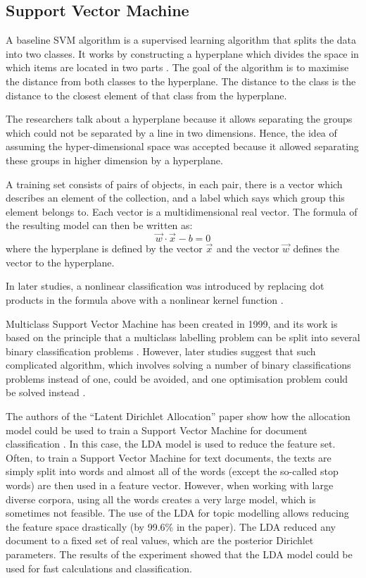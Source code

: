 \subsection{Support Vector Machine}
    A baseline SVM algorithm is a supervised learning algorithm that splits the data into two classes. It works by constructing a hyperplane which divides the space in which items are located in two parts \cite{vapnik1963pattern}. The goal of the algorithm is to maximise the distance from both classes to the hyperplane. The distance to the class is the distance to the closest element of that class from the hyperplane.
    
    The researchers talk about a hyperplane because it allows separating the groups which could not be separated by a line in two dimensions. Hence, the idea of assuming the hyper-dimensional space was accepted because it allowed separating these groups in higher dimension by a hyperplane.
    
    A training set consists of pairs of objects, in each pair, there is a vector which describes an element of the collection, and a label which says which group this element belongs to. Each vector is a multidimensional real vector. The formula of the resulting model can then be written as:
    $$ \vec{w}^{}\cdotp\vec{x}^{}-b=0 $$
    where the hyperplane is defined by the vector $\vec{x}^{}$ and the vector $\vec{w}^{}$ defines the vector to the hyperplane.
    
    In later studies, a nonlinear classification was introduced by replacing dot products in the formula above with a nonlinear kernel function \cite{boser1992training}.
    
    Multiclass Support Vector Machine has been created in 1999, and its work is based on the principle that a multiclass labelling problem can be split into several binary classification problems \cite{platt1999large}. However, later studies suggest that such complicated algorithm, which involves solving a number of binary classifications problems instead of one, could be avoided, and one optimisation problem could be solved instead \cite{crammer2001algorithmic}. 
    
    The authors of the ``Latent Dirichlet Allocation'' paper show how the allocation model could be used to train a Support Vector Machine for document classification \cite{blei2003latent}. In this case, the LDA model is used to reduce the feature set. Often, to train a Support Vector Machine for text documents, the texts are simply split into words and almost all of the words (except the so-called stop words) are then used in a feature vector. However, when working with large diverse corpora, using all the words creates a very large model, which is sometimes not feasible. The use of the LDA for topic modelling allows reducing the feature space drastically (by 99.6\% in the paper). The LDA reduced any document to a fixed set of real values, which are the posterior Dirichlet parameters. The results of the experiment showed that the LDA model could be used for fast calculations and classification. 


